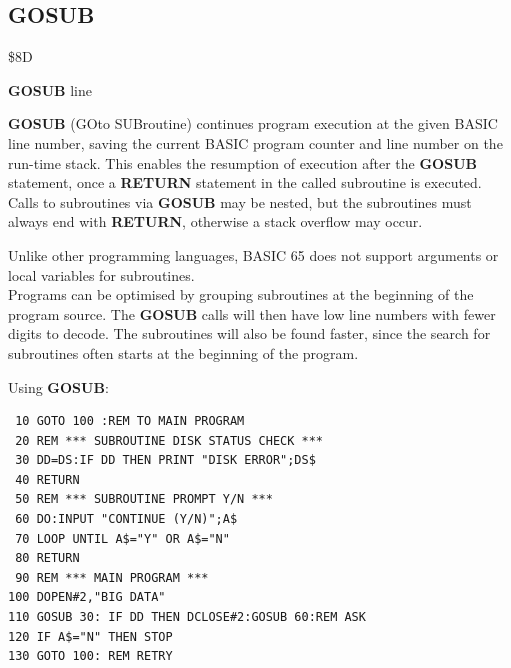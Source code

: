
\newpage
\subsection{GOSUB}
\begin{description}[leftmargin=2cm,style=nextline]
\item [Token:] \$8D
\item [Format:] {\bf GOSUB} line
\item [Usage:] {\bf GOSUB} (GOto SUBroutine)
               continues program
               execution at the given BASIC line number,
               saving the current BASIC program counter
               and line number on the run-time stack.
               This enables the resumption of execution after
               the {\bf GOSUB} statement, once a {\bf RETURN}
               statement in the called subroutine is executed.
               Calls to subroutines via {\bf GOSUB} may be nested,
               but the subroutines must always end with
               {\bf RETURN}, otherwise a stack overflow
               may occur.

\item [Remarks:] Unlike other programming languages, BASIC 65
               does not support arguments or local
               variables for subroutines. \\
               Programs can be optimised by grouping subroutines
               at the beginning of the program source. The
               {\bf GOSUB} calls will then have low line numbers
               with fewer digits to decode. The subroutines
               will also be found faster, since the search for subroutines
               often starts at the beginning of the program.
\item [Example:] Using {\bf GOSUB}:
\begin{tcolorbox}[colback=black,coltext=white]
\verbatimfont{\codefont}
\begin{verbatim}
 10 GOTO 100 :REM TO MAIN PROGRAM
 20 REM *** SUBROUTINE DISK STATUS CHECK ***
 30 DD=DS:IF DD THEN PRINT "DISK ERROR";DS$
 40 RETURN
 50 REM *** SUBROUTINE PROMPT Y/N ***
 60 DO:INPUT "CONTINUE (Y/N)";A$
 70 LOOP UNTIL A$="Y" OR A$="N"
 80 RETURN
 90 REM *** MAIN PROGRAM ***
100 DOPEN#2,"BIG DATA"
110 GOSUB 30: IF DD THEN DCLOSE#2:GOSUB 60:REM ASK
120 IF A$="N" THEN STOP
130 GOTO 100: REM RETRY
\end{verbatim}
\end{tcolorbox}
\end{description}

